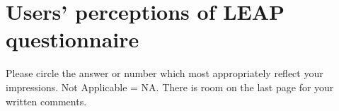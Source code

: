 
\chapter{Users' perceptions of LEAP questionnaire}
\label{sec:perceptions-questionnaire}

Please circle the answer or number which most appropriately reflect your
impressions.  Not Applicable = NA.   There is room on the last page for your
written comments.\\
